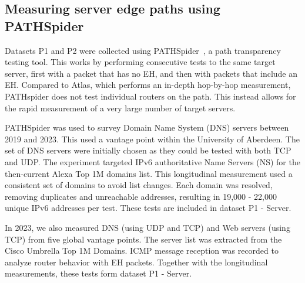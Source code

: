 \documentclass[conference]{IEEEtran}
\begin{document}
\subsection{Measuring server edge paths using PATHSpider}
\label{sec:pathspider-methodology}

Datasets P1 and P2 were collected using
PATHSpider~\cite{learmonth2016pathspider}, a path transparency testing tool. This works by performing consecutive tests to the same target server, first with a packet that has no EH, and then with packets that include an EH.
Compared to Atlas, which performs an in-depth hop-by-hop measurement, PATHspider does not test individual routers on the path. This instead allows for the rapid measurement of a very large number of target servers.

PATHSpider was used to survey Domain Name System (DNS) servers between 2019 and 2023. This used a vantage point within the University of Aberdeen. The set of DNS servers were initially chosen as they could be tested with both TCP and UDP.
The experiment targeted IPv6 authoritative Name Servers (NS) for the
then-current Alexa Top 1M domains list. This longitudinal measurement used a consistent set of domains to avoid list changes. Each domain was resolved, removing duplicates and unreachable addresses, resulting
in 19,000 - 22,000 unique IPv6 addresses per test. These tests are included in dataset P1 - Server.

In 2023, we also measured DNS (using UDP and TCP) and Web servers (using TCP) 
from five global vantage points.
The server list was extracted from the Cisco Umbrella Top 1M Domains. ICMP message reception was recorded to analyze router behavior with EH packets. Together with the longitudinal measurements, these tests form dataset P1 - Server.

\end{document}
